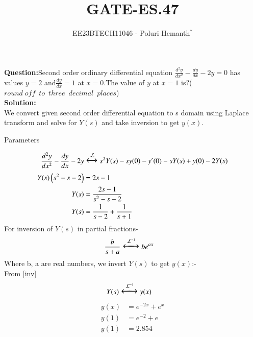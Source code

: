 \documentclass[journal,12pt,twocolumn]{IEEEtran}
\theoremstyle{remark}
\begin{document}

\vspace{3cm}

\title{GATE-ES.47}
\author{EE23BTECH11046 - Poluri Hemanth$^{*}$}
\maketitle
\textbf{Question:}Second order ordinary differential equation $\frac{d^2y}{dx^2}-\frac{dy}{dx}-2y=0$ has values 
$y=2$ and$\frac{dy}{dx}=1$ at $x=0$.The value of $y$ at $x=1$ is?($round\; off\;\: to\;\: three\;\: decimal\;\: places$)
\\
\textbf{Solution:}\\
We convert given second order differential equation to s domain using Laplace transform and solve for $Y(s)$ and take inversion to get $y(x)$.
\begin{table}[h!]
        
        \caption{Parameters}
        \label{tab:es.47}
\end{table}
\begin{align}
    \frac{d^2y}{dx^2}-\frac{dy}{dx}-2y&\Large\xleftrightarrow{\mathcal{L}}s^2Y(s)-sy(0)-y'(0)-sY(s)+y(0)-2Y(s)\\
    Y(s)\left(s^2-s-2\right)&=2s-1\\
    Y(s)&=\frac{2s-1}{s^2-s-2}\\
    Y(s)&=\frac{1}{s-2}+\frac{1}{s+1}
\end{align}
For inversion of $Y(s)$ in partial fractions-
\begin{align}
    &\frac{b}{s+a}\Large\xleftrightarrow{\mathcal{L}^{-1}}be^{ax}\label{inv}
\end{align}
Where b, a are real numbers, we invert $Y(s)$ to get $y(x)$:-\\
From \eqref{inv}
\begin{align}
    &Y(s)\Large\xleftrightarrow{\mathcal{L}^{-1}} y(x)
\end{align}
\begin{align}
    y(x)&=e^{-2x}+e^{x}\\
    y(1)&=e^{-2}+e\\
    y(1)&=2.854
\end{align}
\end{document}
